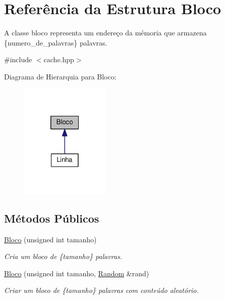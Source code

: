 \hypertarget{structBloco}{}\section{Referência da Estrutura Bloco}
\label{structBloco}


A classe bloco representa um endereço da mémoria que armazena \{numero\+\_\+de\+\_\+palavras\} palavras.  




{\ttfamily \#include $<$cache.\+hpp$>$}



Diagrama de Hierarquia para Bloco\+:\nopagebreak
\begin{figure}[H]
\begin{center}
\leavevmode
\includegraphics[width=121pt]{structBloco__inherit__graph}
\end{center}
\end{figure}
\subsection*{Métodos Públicos}
\begin{DoxyCompactItemize}
\item 
\hyperlink{structBloco_a7690a145e0f647595d28c633d034abb3}{Bloco} (unsigned int tamanho)
\begin{DoxyCompactList}\small\item\em Cria um bloco de \{tamanho\} palavras. \end{DoxyCompactList}\item 
\hyperlink{structBloco_a23af86d8bfc57541015b41571d4558f8}{Bloco} (unsigned int tamanho, \hyperlink{structRandom}{Random} \&rand)
\begin{DoxyCompactList}\small\item\em Criar um bloco de \{tamanho\} palavras com conteúdo aleatório. \end{DoxyCompactList}\end{DoxyCompactItemize}

